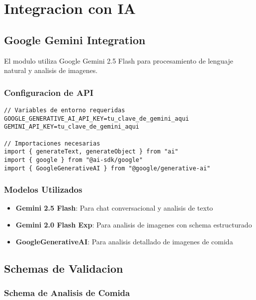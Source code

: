 \documentclass[12pt,a4paper]{article}
\begin{document}
\section{Integracion con IA}

\subsection{Google Gemini Integration}

El modulo utiliza Google Gemini 2.5 Flash para procesamiento de lenguaje natural y analisis de imagenes.

\subsubsection{Configuracion de API}

\begin{lstlisting}[caption=Configuracion de Google Gemini]
// Variables de entorno requeridas
GOOGLE_GENERATIVE_AI_API_KEY=tu_clave_de_gemini_aqui
GEMINI_API_KEY=tu_clave_de_gemini_aqui

// Importaciones necesarias
import { generateText, generateObject } from "ai"
import { google } from "@ai-sdk/google"
import { GoogleGenerativeAI } from "@google/generative-ai"
\end{lstlisting}

\subsubsection{Modelos Utilizados}

\begin{itemize}
    \item \textbf{Gemini 2.5 Flash}: Para chat conversacional y analisis de texto
    \item \textbf{Gemini 2.0 Flash Exp}: Para analisis de imagenes con schema estructurado
    \item \textbf{GoogleGenerativeAI}: Para analisis detallado de imagenes de comida
\end{itemize}

\subsection{Schemas de Validacion}

\subsubsection{Schema de Analisis de Comida}
\end{document}
